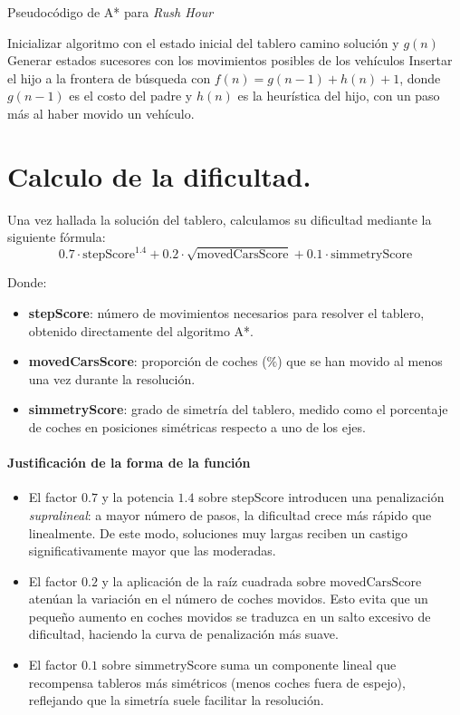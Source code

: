 \documentclass{article}
\begin{document}
\begin{algorithm}
\caption{Pseudocódigo de A* para \textit{Rush Hour}}
\begin{algorithmic}[]
\State Inicializar algoritmo con el estado inicial del tablero
        \State \Return camino solución y $g(n)$
    \EndIf
        \State Generar estados sucesores con los movimientos posibles de los vehículos
            \State Insertar el hijo a la frontera de búsqueda con $f(n) = g(n - 1) + h(n) + 1$, donde $g(n - 1)$ es el costo del padre y $h(n)$ es la heurística del hijo, con un paso más al haber movido un vehículo.
        \EndIf
    \EndFor
\EndWhile
\end{algorithmic}
\end{algorithm}

\section{Calculo de la dificultad.}\label{sec:sec3}

Una vez hallada la solución del tablero, calculamos su dificultad mediante la siguiente fórmula:
\[
0.7 \cdot \text{stepScore}^{1.4} + 0.2 \cdot \sqrt{\text{movedCarsScore}} + 0.1 \cdot \text{simmetryScore}
\]

Donde:
\begin{itemize}
  \item \textbf{stepScore}: número de movimientos necesarios para resolver el tablero, obtenido directamente del algoritmo A*.
  \item \textbf{movedCarsScore}: proporción de coches (\(\%\)) que se han movido al menos una vez durante la resolución.
  \item \textbf{simmetryScore}: grado de simetría del tablero, medido como el porcentaje de coches en posiciones simétricas respecto a uno de los ejes.
\end{itemize}

\paragraph{Justificación de la forma de la función}
\begin{itemize}
  \item El factor \(0.7\) y la potencia \(1.4\) sobre \(\text{stepScore}\) introducen una penalización \emph{supralineal}: a mayor número de pasos, la dificultad crece más rápido que linealmente. De este modo, soluciones muy largas reciben un castigo significativamente mayor que las moderadas.
  \item El factor \(0.2\) y la aplicación de la raíz cuadrada sobre \(\text{movedCarsScore}\) atenúan la variación en el número de coches movidos. Esto evita que un pequeño aumento en coches movidos se traduzca en un salto excesivo de dificultad, haciendo la curva de penalización más suave.
  \item El factor \(0.1\) sobre \(\text{simmetryScore}\) suma un componente lineal que recompensa tableros más simétricos (menos coches fuera de espejo), reflejando que la simetría suele facilitar la resolución.
\end{itemize}
\end{document}
